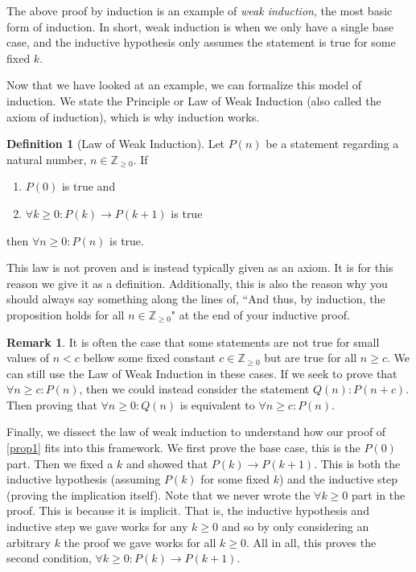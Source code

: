 \documentclass{article}
\newcommand{\ra}{\rightarrow}
\newcommand{\ZZ}{\mathbb{Z}_{\geq 0}}
\theoremstyle{plain}
\theoremstyle{definition}
\newtheorem{definition}{Definition}
\newtheorem{remark}{Remark}
\begin{document}
The above proof by induction is an example of \emph{weak induction}, the most basic form of induction. In short, weak induction is when we only have a single base case, and the inductive hypothesis only assumes the statement is true for some fixed \(k\).

Now that we have looked at an example, we can formalize this model of induction. We state the Principle or Law of Weak Induction (also called the axiom of induction), which is why induction works.

\begin{definition}[Law of Weak Induction]
    Let \(P(n)\) be a statement regarding a natural number, \(n \in \ZZ\). If 
    \begin{enumerate}
        \item \(P(0)\) is true and
        \item \(\forall k \geq 0 : P(k) \ra P(k+1)\) is true
    \end{enumerate}
    then \(\forall n \geq 0 : P(n)\) is true.
\end{definition}

This law is not proven and is instead typically given as an axiom. It is for this reason we give it as a definition. Additionally, this is also the reason why you should always say something along the lines of, ``And thus, by induction, the proposition holds for all \(n \in \ZZ\)" at the end of your inductive proof. 

\begin{remark}
    It is often the case that some statements are not true for small values of \(n < c\) bellow some fixed constant \(c \in \ZZ\) but are true for all \(n \geq c\). We can still use the Law of Weak Induction in these cases. If we seek to prove that \(\forall n \geq c : P(n)\), then we could instead consider the statement \(Q(n) : P(n + c)\). Then proving that \(\forall n \geq 0: Q(n)\) is equivalent to \(\forall n \geq c : P(n)\).
\end{remark}

\phantom{spacer. I could also use vspace if i wanted to}

Finally, we dissect the law of weak induction to understand how our proof of \cref{prop1} fits into this framework. We first prove the base case, this is the \(P(0)\) part. Then we fixed a \(k\) and showed that \(P(k) \ra P(k+1)\). This is both the inductive hypothesis (assuming \(P(k)\) for some fixed \(k\)) and the inductive step (proving the implication itself). Note that we never wrote the \(\forall k \geq 0\) part in the proof. This is because it is implicit. That is, the inductive hypothesis and inductive step we gave works for any \(k \geq 0\) and so by only considering an arbitrary \(k\) the proof we gave works for all \(k \geq 0\). All in all, this proves the second condition, \(\forall k \geq 0 : P(k) \ra P(k+1)\).
\end{document}
